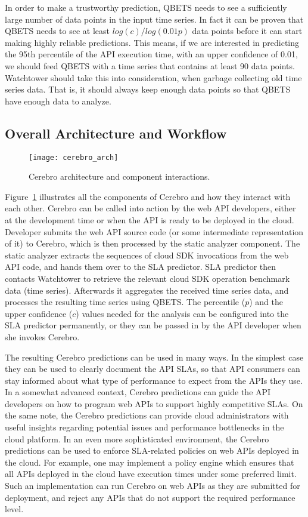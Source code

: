 In order to make a trustworthy prediction, QBETS needs to see a sufficiently large number of data points
in the input time series. In fact it can be proven that QBETS needs to see at least $log(c)/log(0.01p)$ data points
before it can start making highly reliable predictions. This means, if we are interested in predicting the 95th percentile
of the API execution time, with an upper confidence of 0.01, we should feed QBETS with a time series that
contains at least 90 data points. Watchtower should take this into consideration, when garbage collecting old
time series data. That is, it should always keep enough data points so that QBETS have enough data to analyze.

\subsection{Overall Architecture and Workflow}

\begin{figure}
\centering
\texttt{[image: cerebro\_arch]}
\caption{Cerebro architecture and component interactions.}
\label{fig:cerebro_arch}
\end{figure}

Figure~\ref{fig:cerebro_arch} illustrates all the components of Cerebro and how they interact with each other. 
Cerebro can be called into action by the web API developers, either at the development time or when the
API is ready to be deployed in the cloud. Developer submits the web API source code (or some intermediate
representation of it) to Cerebro, which is then processed by the static analyzer component. The static
analyzer extracts the sequences of cloud SDK invocations from the web API code, and hands them over
to the SLA predictor. SLA predictor then contacts Watchtower to retrieve the relevant cloud SDK operation
benchmark data (time series). Afterwards it aggregates the received time series data, and processes
the resulting time series using QBETS. The percentile ($p$) and the upper confidence ($c$) values needed
for the analysis can be configured into the SLA predictor permanently, or they can be passed in by the API
developer when she invokes Cerebro. 

The resulting Cerebro predictions can be used in many ways. In the simplest case they can be
used to clearly document the API SLAs, so that API consumers can stay informed about what 
type of performance to expect from the APIs they use. In a somewhat advanced context, Cerebro
predictions can guide the API developers on how to program web APIs to support highly competitive
SLAs. On the same note, the Cerebro predictions can provide cloud administrators with
useful insights regarding potential issues and performance bottlenecks in the cloud platform. In an
even more sophisticated environment, the Cerebro predictions can be used to enforce SLA-related
policies on web APIs deployed in the cloud. For example, one may implement a policy engine which ensures
that all APIs deployed in the cloud have execution times under some preferred limit. Such an implementation
can run Cerebro on web APIs as they are submitted for deployment, and reject any APIs that do not
support the required performance level.